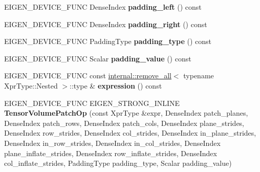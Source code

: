 \begin{DoxyCompactItemize}
\item 
\mbox{\label{class_eigen_1_1_tensor_volume_patch_op_ad27206fe7f69ae54383b918146e2966f}} 
E\+I\+G\+E\+N\+\_\+\+D\+E\+V\+I\+C\+E\+\_\+\+F\+U\+NC Dense\+Index {\bfseries padding\+\_\+left} () const
\item 
\mbox{\label{class_eigen_1_1_tensor_volume_patch_op_aa8afb8908e6f399a14fc09aaa4108787}} 
E\+I\+G\+E\+N\+\_\+\+D\+E\+V\+I\+C\+E\+\_\+\+F\+U\+NC Dense\+Index {\bfseries padding\+\_\+right} () const
\item 
\mbox{\label{class_eigen_1_1_tensor_volume_patch_op_a654090d3e2dfcf741fb184096b3f58a1}} 
E\+I\+G\+E\+N\+\_\+\+D\+E\+V\+I\+C\+E\+\_\+\+F\+U\+NC Padding\+Type {\bfseries padding\+\_\+type} () const
\item 
\mbox{\label{class_eigen_1_1_tensor_volume_patch_op_af2bc93a4dbbd600e020ff1eda193437e}} 
E\+I\+G\+E\+N\+\_\+\+D\+E\+V\+I\+C\+E\+\_\+\+F\+U\+NC Scalar {\bfseries padding\+\_\+value} () const
\item 
\mbox{\label{class_eigen_1_1_tensor_volume_patch_op_a8934f91a7f998943f051084c80d9f824}} 
E\+I\+G\+E\+N\+\_\+\+D\+E\+V\+I\+C\+E\+\_\+\+F\+U\+NC const \hyperlink{struct_eigen_1_1internal_1_1remove__all}{internal\+::remove\+\_\+all}$<$ typename Xpr\+Type\+::\+Nested $>$\+::type \& {\bfseries expression} () const
\item 
\mbox{\label{class_eigen_1_1_tensor_volume_patch_op_abd3362f3580aede62382a3bea56d3edd}} 
E\+I\+G\+E\+N\+\_\+\+D\+E\+V\+I\+C\+E\+\_\+\+F\+U\+NC E\+I\+G\+E\+N\+\_\+\+S\+T\+R\+O\+N\+G\+\_\+\+I\+N\+L\+I\+NE {\bfseries Tensor\+Volume\+Patch\+Op} (const Xpr\+Type \&expr, Dense\+Index patch\+\_\+planes, Dense\+Index patch\+\_\+rows, Dense\+Index patch\+\_\+cols, Dense\+Index plane\+\_\+strides, Dense\+Index row\+\_\+strides, Dense\+Index col\+\_\+strides, Dense\+Index in\+\_\+plane\+\_\+strides, Dense\+Index in\+\_\+row\+\_\+strides, Dense\+Index in\+\_\+col\+\_\+strides, Dense\+Index plane\+\_\+inflate\+\_\+strides, Dense\+Index row\+\_\+inflate\+\_\+strides, Dense\+Index col\+\_\+inflate\+\_\+strides, Padding\+Type padding\+\_\+type, Scalar padding\+\_\+value)

\end{DoxyCompactItemize}
